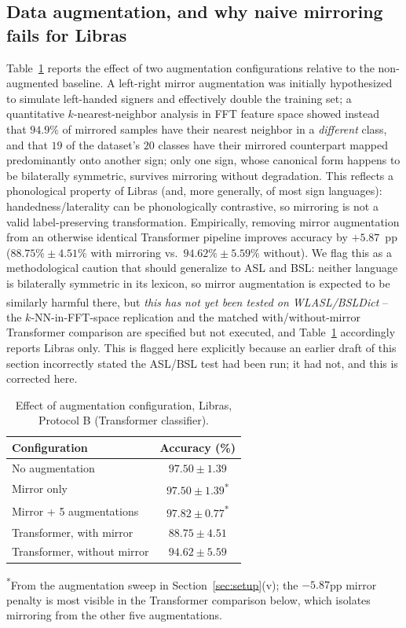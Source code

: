 \documentclass[journal]{IEEEtran}
\newcommand{\best}[1]{\textbf{#1}}
\newcommand{\tbd}[1]{\textit{#1}\textsuperscript{\dag}}   %
\begin{document}
\subsection{Data augmentation, and why naive mirroring fails for Libras}
Table~\ref{tab:augmentation} reports the effect of two augmentation configurations relative to the non-augmented baseline. A left-right mirror augmentation was initially hypothesized to simulate left-handed signers and effectively double the training set; a quantitative $k$-nearest-neighbor analysis in FFT feature space showed instead that $94.9\%$ of mirrored samples have their nearest neighbor in a \emph{different} class, and that $19$ of the dataset's $20$ classes have their mirrored counterpart mapped predominantly onto another sign; only one sign, whose canonical form happens to be bilaterally symmetric, survives mirroring without degradation. This reflects a phonological property of Libras (and, more generally, of most sign languages): handedness/laterality can be phonologically contrastive, so mirroring is not a valid label-preserving transformation. Empirically, removing mirror augmentation from an otherwise identical Transformer pipeline improves accuracy by $+5.87$~pp ($88.75\%\pm4.51\%$ with mirroring vs.\ $94.62\%\pm5.59\%$ without). We flag this as a methodological caution that should generalize to ASL and BSL: neither language is bilaterally symmetric in its lexicon, so mirror augmentation is expected to be similarly harmful there, but \tbd{this has not yet been tested on WLASL/BSLDict} -- the $k$-NN-in-FFT-space replication and the matched with/without-mirror Transformer comparison are specified but not executed, and Table~\ref{tab:augmentation} accordingly reports Libras only. This is flagged here explicitly because an earlier draft of this section incorrectly stated the ASL/BSL test had been run; it had not, and this is corrected here.

\begin{table}[t]
\centering
\caption{Effect of augmentation configuration, Libras, Protocol B (Transformer classifier).}
\label{tab:augmentation}
\begin{tabular}{lc}
\toprule
Configuration & Accuracy (\%) \\
\midrule
No augmentation & $97.50\pm1.39$ \\
Mirror only & $97.50\pm1.39$\textsuperscript{*} \\
Mirror + 5 augmentations & $97.82\pm0.77$\textsuperscript{*} \\
\midrule
Transformer, with mirror & $88.75\pm4.51$ \\
Transformer, without mirror & \best{$94.62\pm5.59$} \\
\bottomrule
\end{tabular}
\begin{flushleft}
\footnotesize\textsuperscript{*}From the augmentation sweep in Section~\ref{sec:setup}(v); the $-5.87$pp mirror penalty is most visible in the Transformer comparison below, which isolates mirroring from the other five augmentations.
\end{flushleft}
\end{table}
\end{document}
